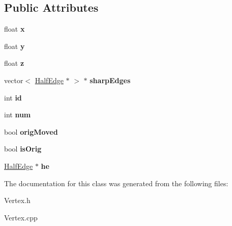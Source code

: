 \subsection*{Public Attributes}
\begin{DoxyCompactItemize}
\item 
\hypertarget{class_vertex_aa592e1564aa3b226ff629b824b240310}{float {\bfseries x}}\label{class_vertex_aa592e1564aa3b226ff629b824b240310}

\item 
\hypertarget{class_vertex_a448817068556fe43e81dc0a3e7d1fa43}{float {\bfseries y}}\label{class_vertex_a448817068556fe43e81dc0a3e7d1fa43}

\item 
\hypertarget{class_vertex_af5d14cd74cd842c01f9a8a8d92325339}{float {\bfseries z}}\label{class_vertex_af5d14cd74cd842c01f9a8a8d92325339}

\item 
\hypertarget{class_vertex_ab8a64d45451aa5af232f7292a27cae43}{vector$<$ \hyperlink{class_half_edge}{Half\-Edge} $\ast$ $>$ $\ast$ {\bfseries sharp\-Edges}}\label{class_vertex_ab8a64d45451aa5af232f7292a27cae43}

\item 
\hypertarget{class_vertex_a2e69697726190f50c7fc040fb1ddac7a}{int {\bfseries id}}\label{class_vertex_a2e69697726190f50c7fc040fb1ddac7a}

\item 
\hypertarget{class_vertex_a426e62928803a13f734083c3eb9b05ed}{int {\bfseries num}}\label{class_vertex_a426e62928803a13f734083c3eb9b05ed}

\item 
\hypertarget{class_vertex_a78894461dc7a9ed682d44ffb1b13f796}{bool {\bfseries orig\-Moved}}\label{class_vertex_a78894461dc7a9ed682d44ffb1b13f796}

\item 
\hypertarget{class_vertex_a80f09d2cbb18051081cbd9e743049464}{bool {\bfseries is\-Orig}}\label{class_vertex_a80f09d2cbb18051081cbd9e743049464}

\item 
\hypertarget{class_vertex_a2a42fe23fe475c602a014d64aeae88ec}{\hyperlink{class_half_edge}{Half\-Edge} $\ast$ {\bfseries he}}\label{class_vertex_a2a42fe23fe475c602a014d64aeae88ec}

\end{DoxyCompactItemize}


The documentation for this class was generated from the following files\-:\begin{DoxyCompactItemize}
\item 
Vertex.\-h\item 
Vertex.\-cpp\end{DoxyCompactItemize}
